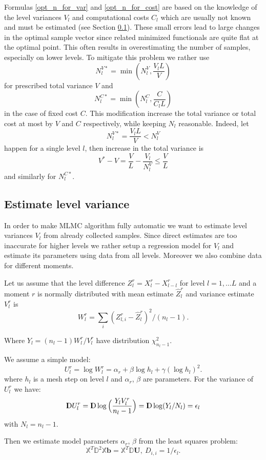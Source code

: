 \documentclass{article}
\def\vc#1{\mathbf{\boldsymbol{#1}}}     %
\def\tn#1{\mathbb{#1}}
\def \D{{{\rm I\kern-.3em D}}}
\begin{document}
Formulas \eqref{opt_n_for_var} and \eqref{opt_n_for_cost} are based on the knowledge of the level variances $V_l$ and computational costs $C_l$ which are usually not known and must be estimated (see Section \ref{sec:VarEst}). These small errors lead to large changes in the optimal sample vector since related minimized functionals are quite flat at the optimal point.  This often results in overestimating the number of samples, especially on lower levels. To mitigate this problem we rather use
\[
	N_l^{V*} = \min( N_l^V, \frac{V_l L}{V} )
\]
for prescribed total variance $V$ and
\[
	N_l^{C*} = \min( N_l^C, \frac{C}{C_l L} )
\]
in the case of fixed cost $C$. This modification increase the total variance or total cost at most by $V$ and $C$ respectively, while keeping  $N_l$ reasonable. Indeed, let
\[
	N_l^{V*} = \frac{V_l L}{V} < N_l^V 
\]
happen for a single level $l$, then increase in the total variance is
\[
    V^* - V = \frac{V}{L} - \frac{V_l}{N_l^V} \le \frac{V}{L}
\]
and similarly for $N_l^{C*}$.



\subsection{Estimate level variance}
\label{sec:VarEst}
In order to make MLMC algorithm fully automatic we want to estimate level variances $V_l$ from already collected samples. Since direct estimates are too inaccurate for higher levels we rather setup a regression model for $V_l$ and estimate its parameters using data 
from all levels. Moreover we also combine data for different moments.

Let us assume that the level difference $Z_l^r = X_l^r - X^r_{l-l}$ for level $l=1,\dots L$ and a moment $r$ is normally distributed 
with mean estimate $\hat{Z}_l^r$ and variance estimate $V_l^r$ is
$$
W_l^r = \sum_{i} (Z^r_{l,i} - \hat{Z}_l^r)^2 / (n_l - 1).
$$

Where $Y_l = (n_l -1)W_l^r/V_l^r$ have distribution $\chi^2_{n_l -1}$.

We assume a simple model:
$$
  U_l^r = \log W_l^r =  \alpha_r + \beta \log h_l + \gamma (\log h_l)^2.
$$
where $h_l$ is a mesh step on level $l$ and $\alpha_r$, $\beta$ are parameters. 
For the variance of $U_l^r$ we have:
$$
  \D U_l^r = \D \log \Big( \frac{Y_l V_l^r}{n_l - 1} \Big) = \D \log (Y_l/N_l) = \epsilon_l
$$
with $N_l = n_l - 1$.

Then we estimate model parameters $\alpha_r$, $\beta$ from the least squares problem:
$$
    \tn{X}^T \tn{D}^2 \tn{X} \vc{b} = \tn{X}^T \tn{D} \vc{U},
    \ D_{i,i} = 1/\epsilon_{l}.
$$
\end{document}
